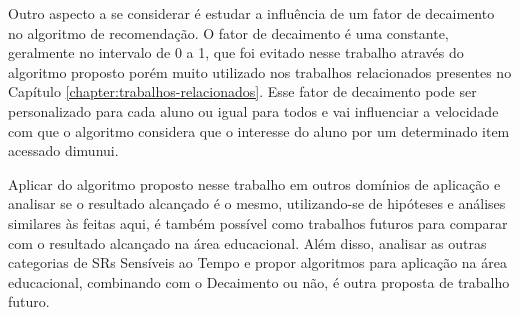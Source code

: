 Outro aspecto a se considerar é estudar a influência de um fator de decaimento no algoritmo de recomendação. O fator de
decaimento é uma constante, geralmente no intervalo de 0 a 1, que foi evitado nesse trabalho através do algoritmo proposto
porém muito utilizado nos trabalhos relacionados presentes no Capítulo \ref{chapter:trabalhos-relacionados}. Esse
fator de decaimento pode ser personalizado para cada aluno ou igual para todos e vai influenciar a velocidade com que o
algoritmo considera que o interesse do aluno por um determinado item acessado dimunui.

Aplicar do algoritmo proposto nesse trabalho em outros domínios de aplicação e analisar se o resultado alcançado é o mesmo,
utilizando-se de hipóteses e análises similares às feitas aqui, é também possível como trabalhos futuros para comparar
com o resultado alcançado na área educacional. Além disso, analisar as outras categorias de SRs Sensíveis ao Tempo e
propor algoritmos para aplicação na área educacional, combinando com o Decaimento ou não, é outra proposta de trabalho
futuro.
